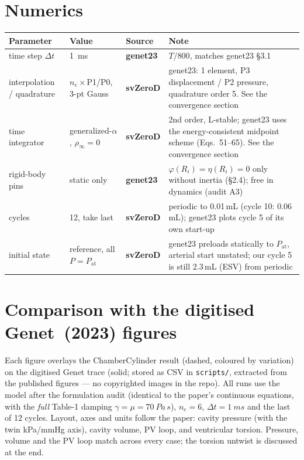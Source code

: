 \documentclass[10pt]{article}
\newcommand{\gen}{\textcolor{cgen}{\textbf{genet23}}}
\newcommand{\svz}{\textcolor{csvz}{\textbf{svZeroD}}}
\begin{document}
\section*{Numerics}
\begin{longtable}{l l l P{6.4cm}}
\toprule Parameter & Value & Source & Note \\ \midrule\endhead
time step $\Delta t$ & \SI{1}{ms} & \gen & $T/800$, matches genet23 \S3.1 \\
interpolation / quadrature & $n_e\times$P1/P0, 3-pt Gauss & \svz & genet23: 1 element, P3 displacement / P2 pressure, quadrature order 5. See the convergence section \\
time integrator & generalized-$\alpha$, $\rho_\infty{=}0$ & \svz & 2nd order, L-stable; genet23 uses the energy-consistent midpoint scheme (Eqs.~51--65). See the convergence section \\
rigid-body pins & static only & \gen & $\varphi(R_i){=}\eta(R_i){=}0$ only without inertia (\S2.4); free in dynamics (audit A3) \\
cycles & 12, take last & \svz & periodic to 0.01\,mL (cycle 10: 0.06\,mL); genet23 plots cycle 5 of its own start-up \\
initial state & reference, all $P{=}P_\text{at}$ & \svz & genet23 preloads statically to $P_\text{at}$, arterial start unstated; our cycle 5 is still 2.3\,mL (ESV) from periodic \\
\bottomrule
\end{longtable}

\clearpage
\section*{Comparison with the digitised Genet~(2023) figures}
\noindent Each figure overlays the ChamberCylinder result (dashed, coloured by variation) on the
digitised Genet trace (solid; stored as CSV in \texttt{scripts/}, extracted from the published
figures --- no copyrighted images in the repo). All runs use the model after the formulation
audit (identical to the paper's continuous equations, with the \emph{full} Table-1 damping
$\gamma{=}\mu{=}\SI{70}{Pa\,s}$), $n_e=6$, $\Delta t=\SI{1}{ms}$ and the last of 12 cycles.
Layout, axes and units follow the paper: cavity pressure
(with the twin kPa/mmHg axis), cavity volume, PV loop, and ventricular torsion. Pressure, volume
and the PV loop match across every case; the torsion untwist is discussed at the end.
\end{document}
